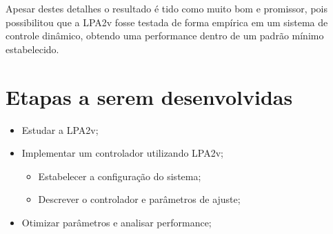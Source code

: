 Apesar destes detalhes o resultado é tido como muito bom e promissor,
pois possibilitou que a LPA2v fosse testada de forma empírica em um sistema
de controle dinâmico, obtendo uma performance dentro de um padrão mínimo 
estabelecido.





\section{Etapas a serem desenvolvidas}

\begin{itemize}
\item Estudar a LPA2v;
\item Implementar um controlador utilizando LPA2v;
	\begin{itemize}
	\item Estabelecer a configuração do sistema;
	\item Descrever o controlador e parâmetros de ajuste;
	\end{itemize}
\item Otimizar parâmetros e analisar performance;
\end{itemize}


